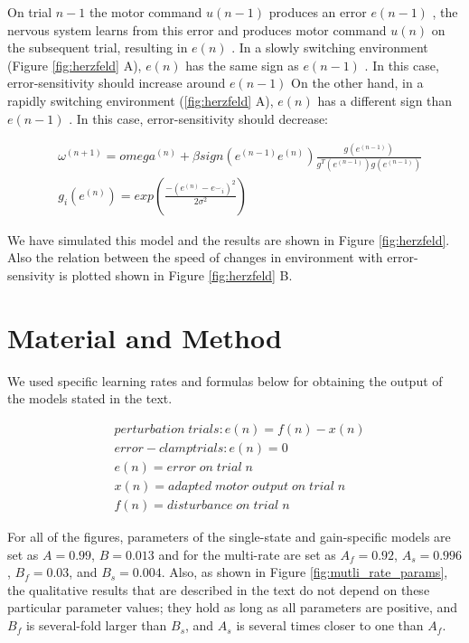 \documentclass[9pt,twocolumn]{paper-template}
\begin{document}
On trial $n-1$ the motor command $u(n-1)$ produces an error $e(n-1)$ , the nervous system learns from this error and produces motor command $u (n)$ on the subsequent trial, resulting in $e(n)$ . In a slowly switching environment (Figure \ref{fig:herzfeld} A), $e(n)$ has the same sign as $e(n-1)$ . In this case, error-sensitivity should increase around $e(n-1)$ On the other hand, in a rapidly switching environment (\ref{fig:herzfeld} A), $e(n)$ has a different sign than $e(n-1)$ . In this case, error-sensitivity should decrease:

\begin{eqnarray*}
& \omega^{(n+1)} =omega^{(n)}+\beta sign(e^{(n-1)}e^{(n)}) \frac{g(e^{(n-1)})}{g^T(e^{(n-1)})g(e^{(n-1)})}\\
&g_i(e^{(n)}) = exp(\frac{-(e^{(n)}-{e^\smallsmile}_i)^2}{2\sigma^2})
\end{eqnarray*}

We have simulated this model and the results are shown in Figure \ref{fig:herzfeld}. Also the relation between the speed of changes in environment with error-sensivity is plotted shown in Figure \ref{fig:herzfeld} B. 

\section*{Material and Method}
We used specific learning rates and formulas below for obtaining the output of the models stated in the text.

\begin{eqnarray*}
& perturbation\;trials : e(n)=f(n)-x(n)\\
& error-clamp trials : e(n) = 0\\
& e(n) = error\;on\;trial\;n\\
& x(n) = adapted\;motor\;output\;on\;trial\;n\\
& f(n) = disturbance\;on\;trial\;n
\end{eqnarray*}

For all of the figures, parameters of the single-state and gain-specific models are set as $A=0.99$, $B=0.013$ and for the multi-rate are set as $A_f = 0.92$, $A_s = 0.996$, $B_f = 0.03$, and $B_s = 0.004$. Also, as shown in Figure \ref{fig:mutli_rate_params}, the qualitative results that are described in the text do not depend on these particular parameter values; they hold as long as all parameters are positive, and $B_f$ is several-fold larger than $B_s$, and $A_s$ is several times closer to one than $A_f$.
\end{document}

